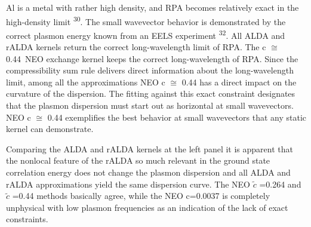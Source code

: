 \documentclass[12pt]{article}
\renewcommand{\_}{\kern-1.5pt\textunderscore\kern-1.5pt}
\begin{document}
\begin{justify}
Al is a metal with rather high density, and RPA becomes relatively exact in the high-density limit \textsuperscript{30}. The small wavevector behavior is demonstrated by the correct plasmon energy known from an EELS experiment \textsuperscript{32}. All ALDA and rALDA kernels return the correct long-wavelength limit of RPA. The c \(  \cong  \) 0.44\  NEO exchange kernel keeps the correct long-wavelength of RPA. Since the compressibility sum rule delivers direct information about the long-wavelength limit, among all the approximations NEO c \(  \cong  \) 0.44 has a direct impact on the curvature of the dispersion. The fitting against this exact constraint designates that the plasmon dispersion must start out as horizontal at small wavevectors. NEO c \(  \cong  \) 0.44 exemplifies the best behavior at small wavevectors that any static kernel can demonstrate.
\end{justify}\par

\begin{justify}
Comparing the ALDA and rALDA kernels at the left panel it is apparent that the nonlocal feature of the rALDA so much relevant in the ground state correlation energy does not change the plasmon dispersion and all ALDA and rALDA approximations yield the same dispersion curve. The NEO  \( \widetilde{c} \) =0.264 and  \( \widetilde{c} \) =0.44 methods basically agree, while the NEO c=0.0037 is completely unphysical with low plasmon frequencies as an indication of the lack of exact constraints.
\end{justify}\par


\vspace{\baselineskip}
\setlength{\parskip}{9.96pt}

\vspace{\baselineskip}
\setlength{\parskip}{0.0pt}
\setlength{\parskip}{9.96pt}

\vspace{\baselineskip}
\setlength{\parskip}{0.0pt}
\setlength{\parskip}{9.96pt}


\end{document}

